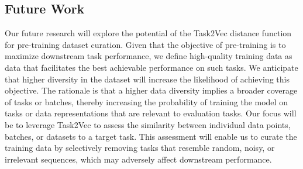 \subsection{Future Work}
Our future research will explore the potential of the Task2Vec distance function for pre-training dataset curation. 
Given that the objective of pre-training is to maximize downstream task performance, we define high-quality training data as data that facilitates the best achievable performance on such tasks.
We anticipate that higher diversity in the dataset will increase the likelihood of achieving this objective.  
The rationale is that a higher data diversity implies a broader coverage of tasks or batches, thereby increasing the probability of training the model on tasks or data representations that are relevant to evaluation tasks.
Our focus will be to leverage Task2Vec to assess the similarity between individual data points, batches, or datasets to a target task. 
This assessment will enable us to curate the training data by selectively removing tasks that resemble random, noisy, or irrelevant sequences, which may adversely affect downstream performance.















